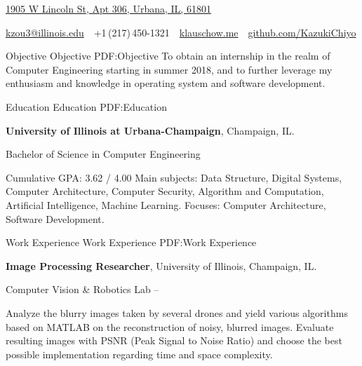 \documentclass[letterpaper,MMMyyyy,nonstopmode]{simpleresumecv}
\newcommand{\CVAuthor}{Kexuan (Klaus) Zou}
\newcommand{\CVWebpage}{github.com/KazukiChiyo}
\begin{document}

\Title{\CVAuthor}

\begin{SubTitle}
\href{https://www.google.es/maps/place/1905+N+Lincoln+Ave,+Urbana,+IL+61801,+USA/@40.1299598,-88.2218938,17z/data=!3m1!4b1!4m5!3m4!1s0x880cd7625bc1ff43:0x85446ada3a3d311d!8m2!3d40.1299598!4d-88.2196998?hl=en}
{1905 W Lincoln St, Apt 306, Urbana, IL, 61801}
\par
\href{mailto:kzou3@illinois.edu}
{kzou3@illinois.edu}
\,\SubBulletSymbol\,
+1\,(217)\,450-1321
\,\SubBulletSymbol\,
\href{https://www.klauschow.me}
{\url{klauschow.me}}
\,\SubBulletSymbol\,
\href{https://github.com/KazukiChiyo}
{\url{\CVWebpage}}
\end{SubTitle}

\begin{Body}
\Section
{Objective}
{Objective}
{PDF:Objective}
\Entry
To obtain an internship in the realm of Computer Engineering starting in summer 2018, and to further leverage my enthusiasm and knowledge in operating system and software development.

\Section
{Education}
{Education}
{PDF:Education}

\Entry
\textbf{University of Illinois at Urbana-Champaign},
Champaign, IL.

\Gap
\BulletItem
Bachelor of Science in Computer Engineering
\hfill
{}
\begin{Detail}
\SubBulletItem
Cumulative GPA: 3.62 / 4.00
\SubBulletItem
Main subjects: Data Structure, Digital Systems, Computer Architecture, Computer Security, Algorithm and Computation, Artificial Intelligence, Machine Learning.
\SubBulletItem
Focuses:
Computer Architecture, Software Development.
\end{Detail}



\Section
{Work Experience}
{Work Experience}
{PDF:Work Experience}

\Entry
\textbf{Image Processing Researcher}, University of Illinois, Champaign, IL.

\Gap
\BulletItem
Computer Vision \& Robotics Lab
\hfill
{} --
\begin{Detail}
\SubBulletItem
Analyze the blurry images taken by several drones and yield various algorithms based on MATLAB on the reconstruction of noisy, blurred images.
\SubBulletItem
Evaluate resulting images with PSNR (Peak Signal to Noise Ratio) and choose the best possible implementation regarding time and space complexity.
\end{Detail}



\end{Body}
\end{document}
